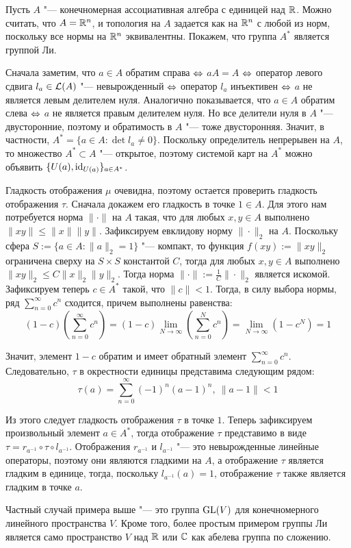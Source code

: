 \begin{example}
	Пусть $A$ "--- конечномерная ассоциативная алгебра с единицей над $\mathbb{R}$. Можно считать, что $A = \mathbb{R}^n$, и топология на $A$ задается как на $\mathbb{R}^n$ с любой из норм, поскольку все нормы на $\mathbb{R}^n$ эквивалентны. Покажем, что группа $A^*$ является группой Ли. 
	
	Сначала заметим, что $a \in A$ обратим справа $\Leftrightarrow$ $aA = A$ $\Leftrightarrow$ оператор левого сдвига $l_a \in \mathcal L(A)$ "--- невырожденный $\Leftrightarrow$ оператор $l_a$ инъективен $\Leftrightarrow$ $a$ не является левым делителем нуля. Аналогично показывается, что $a \in A$ обратим слева $\Leftrightarrow$ $a$ не является правым делителем нуля. Но все делители нуля в $A$ "--- двусторонние, поэтому и обратимость в $A$ "--- тоже двусторонняя. Значит, в частности, $A^* = \{a \in A: \det{l_a} \ne 0\}$. Поскольку определитель непрерывен на $A$, то множество $A^* \subset A$ "--- открытое, поэтому системой карт на $A^*$ можно объявить $\{U(a), \mathrm{id}_{U(a)}\}_{a \in A^*}$.
	
	Гладкость отображения $\mu$ очевидна, поэтому остается проверить гладкость отображения $\tau$. Сначала докажем его гладкость в точке $1 \in A$. Для этого нам потребуется норма $\| \cdot \|$ на $A$ такая, что для любых $x, y \in A$ выполнено $\|xy\| \le \|x\| \|y\|$. Зафиксируем евклидову норму $\| \cdot \|_2$ на $A$. Поскольку сфера $S := \{a \in A: \|a\|_2 = 1\}$ "--- компакт, то функция $f(xy) := \|xy\|_2$ ограничена сверху на $S \times S$ константой $C$, тогда для любых $x, y \in A$ выполнено $\|xy\|_2 \le C\|x\|_2\|y\|_2$. Тогда норма $\|\cdot\| := \frac{1}{C}\|\cdot\|_2$ является искомой. Зафиксируем теперь $c \in A^*$ такой, что $\|c\| < 1$. Тогда, в силу выбора нормы, ряд $\sum_{n=0}^\infty c^n$ сходится, причем выполнены равенства:
	\[(1-c)\left(\sum_{n=0}^\infty c^n\right) = (1-c)\lim_{N \to \infty}\left(\sum_{n=0}^Nc^n\right) = \lim_{N \to \infty}\left(1 - c^N\right) = 1\]
	
	Значит, элемент $1 - c$ обратим и имеет обратный элемент $\sum_{n=0}^\infty c^n$. Следовательно, $\tau$ в окрестности единицы представима следующим рядом:
	\[\tau(a) = \sum_{n=0}^\infty (-1)^n(a - 1)^n,~\|a - 1\| < 1\]
	
	Из этого следует гладкость отображения $\tau$ в точке $1$. Теперь зафиксируем произвольный элемент $a \in A^*$, тогда отображение $\tau$ представимо в виде $\tau = r_{a^{-1}} \circ \tau \circ l_{a^{-1}}$. Отображения $r_{a^{-1}}$ и $l_{a^{-1}}$ "--- это невырожденные линейные операторы, поэтому они являются гладкими на $A$, а отображение $\tau$ является гладким в единице, тогда, поскольку $l_{a^{-1}}(a) = 1$, отображение $\tau$ также является гладким в точке $a$.
\end{example}

\begin{note}
	Частный случай примера выше "--- это группа $\operatorname{GL}(V)$ для конечномерного линейного пространства $V$. Кроме того, более простым примером группы Ли является само пространство $V$ над $\mathbb{R}$ или $\mathbb{C}$ как абелева группа по сложению.
\end{note}